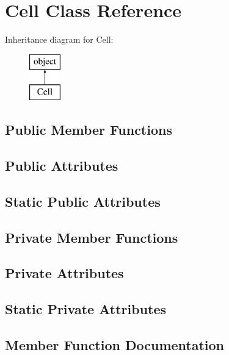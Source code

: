 \hypertarget{classopenbu_1_1cell_1_1_cell}{}\section{Cell Class Reference}
\label{classopenbu_1_1cell_1_1_cell}
Inheritance diagram for Cell\+:\begin{figure}[H]
\begin{center}
\leavevmode
\includegraphics[height=2.000000cm]{classopenbu_1_1cell_1_1_cell}
\end{center}
\end{figure}
\subsection*{Public Member Functions}
\subsection*{Public Attributes}
\subsection*{Static Public Attributes}
\subsection*{Private Member Functions}
\subsection*{Private Attributes}
\subsection*{Static Private Attributes}


\subsection{Member Function Documentation}
\mbox{\label{classopenbu_1_1cell_1_1_cell_a60241928100db6ecdc4c8c3459506da9}} 
